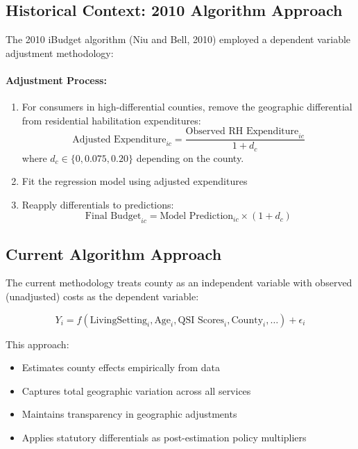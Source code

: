 \subsection{Historical Context: 2010 Algorithm Approach}

The 2010 iBudget algorithm (Niu and Bell, 2010) employed a dependent variable adjustment methodology:

\paragraph{Adjustment Process:}
\begin{enumerate}
    \item For consumers in high-differential counties, remove the geographic differential from residential habilitation expenditures:
    \begin{equation}
    \text{Adjusted Expenditure}_{ic} = \frac{\text{Observed RH Expenditure}_{ic}}{1 + d_c}
    \label{eq:2010-adjustment}
    \end{equation}
    where $d_c \in \{0, 0.075, 0.20\}$ depending on the county.
    
    \item Fit the regression model using adjusted expenditures
    
    \item Reapply differentials to predictions:
    \begin{equation}
    \text{Final Budget}_{ic} = \text{Model Prediction}_{ic} \times (1 + d_c)
    \label{eq:2010-reapplication}
    \end{equation}
\end{enumerate}

\subsection{Current Algorithm Approach}

The current methodology treats county as an independent variable with observed (unadjusted) costs as the dependent variable:

\begin{equation}
Y_i = f(\text{LivingSetting}_i, \text{Age}_i, \text{QSI Scores}_i, \text{County}_i, \ldots) + \epsilon_i
\label{eq:current-model}
\end{equation}

This approach:
\begin{itemize}
    \item Estimates county effects empirically from data
    \item Captures total geographic variation across all services
    \item Maintains transparency in geographic adjustments
    \item Applies statutory differentials as post-estimation policy multipliers
\end{itemize}

